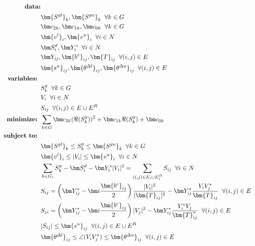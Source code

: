 \begin{align}
%
\mbox{\bf data:} & \nonumber \\ 
& \bm {S^{gl}}_k, \bm {S^{gu}}_k \;\; \forall k \in G \nonumber \\
& \bm c_{2k}, \bm c_{1k}, \bm c_{0k} \;\; \forall k \in G \nonumber \\
& \bm {v^l}_i, \bm {v^u}_i \;\; \forall i \in N \nonumber \\
& \bm S^d_i, \bm Y^s_{i} \;\; \forall i \in N \nonumber \\
& \bm Y_{ij}, \bm {b^c}_{ij}, \bm{T}_{ij} \;\; \forall (i,j) \in E \nonumber \\
& \bm {s^u}_{ij}, \bm {\theta^{\Delta l}}_{ij}, \bm {\theta^{\Delta u}}_{ij} \;\; \forall (i,j) \in E  \nonumber \\
%
\mbox{\bf variables: } & \nonumber \\
& S^g_k \;\; \forall k\in G \nonumber \\
& V_i \;\; \forall i\in N \nonumber \\
& S_{ij} \;\; \forall (i,j) \in E \cup E^R \nonumber \\
%
\mbox{\bf minimize: } & \sum_{k \in G} \bm c_{2k} (\Re(S^g_k))^2 + \bm c_{1k}\Re(S^g_k) + \bm c_{0k} \\
%
\mbox{\bf subject to: } & \nonumber \\
& \bm {S^{gl}}_k \leq S^g_k \leq \bm {S^{gu}}_k \;\; \forall k \in G  \\
& \bm {v^l}_i \leq |V_i| \leq \bm {v^u}_i \;\; \forall i \in N \\
& \sum_{\substack{k \in G_i}} S^g_k - {\bm S^d_i} - \bm Y^s_{i} |V_i|^2 = \sum_{\substack{(i,j)\in E_i \cup E_i^R}} S_{ij} \;\; \forall i\in N \\ 
& S_{ij} = \left( \bm Y^*_{ij} - \bm i\frac{\bm {b^c}_{ij}}{2} \right) \frac{|V_i|^2}{|\bm{T}_{ij}|^2} - \bm Y^*_{ij} \frac{V_i V^*_j}{\bm{T}_{ij}} \;\; \forall (i,j)\in E \\
& S_{ji} = \left( \bm Y^*_{ij} - \bm i\frac{\bm {b^c}_{ij}}{2} \right) |V_j|^2 - \bm Y^*_{ij} \frac{V^*_i V_j}{\bm{T}^*_{ij}} \;\; \forall (i,j)\in E \\
& |S_{ij}| \leq \bm {s^u}_{ij} \;\; \forall (i,j) \in E \cup E^R \\
& \bm {\theta^{\Delta l}}_{ij} \leq \angle (V_i V^*_j) \leq \bm {\theta^{\Delta u}}_{ij} \;\; \forall (i,j) \in E
%
\end{align}
